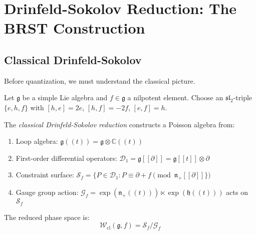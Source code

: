 \section{Drinfeld-Sokolov Reduction: The BRST Construction}

\subsection{Classical Drinfeld-Sokolov}

Before quantization, we must understand the classical picture.

\begin{definition}\label{def:classical-ds}
Let $\mathfrak{g}$ be a simple Lie algebra and $f \in \mathfrak{g}$ a nilpotent element. Choose an $\mathfrak{sl}_2$-triple $\{e, h, f\}$ with $[h,e] = 2e$, $[h,f] = -2f$, $[e,f] = h$.

The \emph{classical Drinfeld-Sokolov reduction} constructs a Poisson algebra from:
\begin{enumerate}
\item Loop algebra: $\mathfrak{g}((t)) = \mathfrak{g} \otimes \mathbb{C}((t))$
\item First-order differential operators: $\mathcal{D}_1 = \mathfrak{g}[[\partial]] = \mathfrak{g}[[t]] \otimes \partial$
\item Constraint surface: $\mathcal{S}_f = \{P \in \mathcal{D}_1 : P \equiv \partial + f \pmod{\mathfrak{n}_+[[\partial]]\}}$
\item Gauge group action: $\mathcal{G}_f = \exp(\mathfrak{n}_+((t))) \ltimes \exp(\mathfrak{h}((t)))$ acts on $\mathcal{S}_f$
\end{enumerate}

The reduced phase space is:
\begin{equation}
\mathcal{W}_{\text{cl}}(\mathfrak{g}, f) = \mathcal{S}_f / \mathcal{G}_f
\end{equation}
\end{definition}


